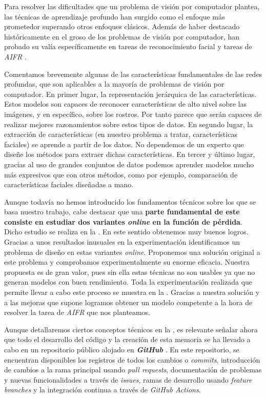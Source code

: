 Para resolver las dificultades que un problema de visión por computador plantea, las técnicas de aprendizaje profundo han surgido como el enfoque más prometedor superando otros enfoques clásicos. Además de haber destacado históricamente en el groso de los problemas de visión por computador, han probado su valía específicamente en tareas de reconocimiento facial \cite{informatica:deep_fr_survey} y tareas de \textit{AIFR} \cite{informatica:aifr_survey}.

Comentamos brevemente algunas de las características fundamentales de las redes profundas, que son aplicables a la mayoría de problemas de visión por computador. En primer lugar, la representación jerárquica de las características. Estos modelos son capaces de reconocer características de alto nivel sobre las imágenes, y en específico, sobre los rostros. Por tanto parece que serán capaces de realizar mejores razonamientos sobre estos tipos de datos. En segundo lugar, la extracción de características (en nuestro problema a tratar, características faciales) se aprende a partir de los datos. No dependemos de un experto que diseñe los métodos para extraer dichas características. En tercer y último lugar, gracias al uso de grandes conjuntos de datos podemos aprender modelos mucho más expresivos que con otros métodos, como por ejemplo, comparación de características faciales diseñadas a mano.

Aunque todavía no hemos introducido los fundamentos técnicos sobre los que se basa nuestro trabajo, cabe destacar que una \textbf{parte fundamental de este consiste en estudiar dos variantes \textit{online} en la función de pérdida}. Dicho estudio se realiza en la . En este sentido obtenemos muy buenos logros. Gracias a unos resultados inusuales en la experimentación identificamos un problema de diseño en estas variantes \textit{online}. Proponemos una solución original a este problema y comprobamos experimentalmente su enorme eficacia. Nuestra propuesta es de gran valor, pues sin ella estas técnicas no son usables ya que no generan modelos con buen rendimiento. Toda la experimentación realizada que permite llevar a cabo este proceso se muestra en la . Gracias a nuestra solución y a las mejoras que supone logramos obtener un modelo competente a la hora de resolver la tarea de \textit{AIFR} que nos planteamos.

Aunque detallaremos ciertos conceptos técnicos en la , es relevante señalar ahora que todo el desarrollo del código y la creación de esta memoria se ha llevado a cabo en un repositorio público alojado en \textbf{\textit{GitHub}} \cite{informatica:repogithub}. En este repositorio, se encuentran disponibles los registros de todos los cambios o \textit{commits}, introducción de cambios a la rama principal usando \textit{pull requests}, documentación de problemas y nuevas funcionalidades a través de \textit{issues}, ramas de desarrollo usando \textit{feature branches} y la integración continua a través de \textit{GitHub Actions}.

